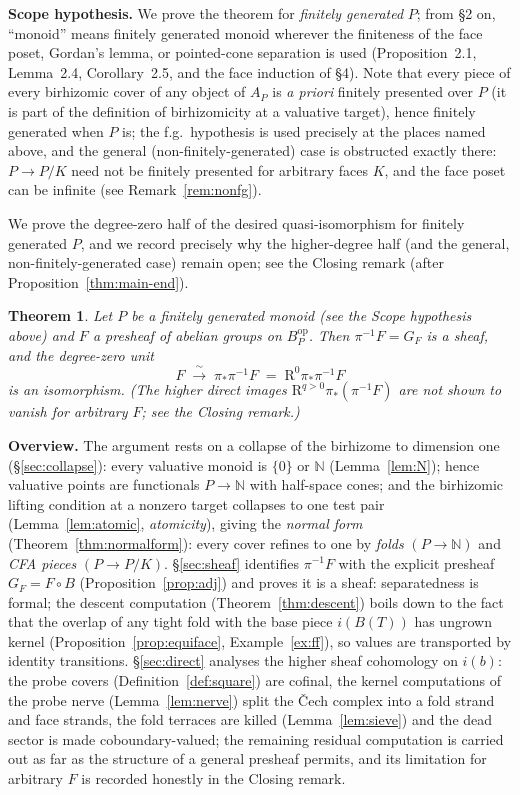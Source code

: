 \documentclass[11pt]{article}
\newtheorem{theorem}{Theorem}[section]
\theoremstyle{definition}
\newcommand{\op}{\mathrm{op}}
\begin{document}
\noindent\textbf{Scope hypothesis.} We prove the theorem for
\emph{finitely generated} $P$; from \S2 on, ``monoid'' means
finitely generated monoid wherever the finiteness of the face poset,
Gordan's lemma, or pointed-cone separation is used (Proposition~2.1,
Lemma~2.4, Corollary~2.5, and the face induction of \S4). Note that
every piece of every birhizomic cover of any object of $A_P$ is
\emph{a priori} finitely presented over $P$ (it is part of the
definition of birhizomicity at a valuative target), hence finitely
generated when $P$ is; the f.g.\ hypothesis is used precisely at the
places named above, and the general (non-finitely-generated) case is
obstructed exactly there: $P\to P/K$ need not be finitely presented
for arbitrary faces $K$, and the face poset can be infinite (see
Remark~\ref{rem:nonfg}).

We prove the degree-zero half of the desired quasi-isomorphism for
finitely generated $P$, and we record precisely why the higher-degree
half (and the general, non-finitely-generated case) remain open; see
the Closing remark (after Proposition~\ref{thm:main-end}).

\begin{theorem}\label{thm:main}
Let $P$ be a \emph{finitely generated} monoid \textup{(}see the Scope
hypothesis above\textup{)} and $F$ a presheaf of abelian groups on
$B_P^{\op}$. Then $\pi^{-1}F=G_F$ is a sheaf, and the degree-zero
unit
\[
F\;\xrightarrow{\ \sim\ }\;\pi_{*}\pi^{-1}F
\;=\;\mathrm R^{0}\pi_{*}\pi^{-1}F
\]
is an isomorphism. \textup{(}The higher direct images
$\mathrm R^{q>0}\pi_{*}(\pi^{-1}F)$ are \emph{not} shown to vanish
for arbitrary $F$; see the Closing remark.\textup{)}
\end{theorem}

\noindent\textbf{Overview.}
The argument rests on a collapse of the birhizome to dimension one
(\S\ref{sec:collapse}): every valuative monoid is $\{0\}$ or $\mathbb N$
(Lemma~\ref{lem:N}); hence valuative points are functionals
$P\to\mathbb N$ with half-space cones; and the birhizomic lifting
condition at a nonzero target collapses to one test pair
(Lemma~\ref{lem:atomic}, \emph{atomicity}), giving the \emph{normal
form} (Theorem~\ref{thm:normalform}): every cover refines to one by
\emph{folds} $(P\to\mathbb N)$ and \emph{CFA pieces} $(P\to P/K)$.
\S\ref{sec:sheaf} identifies $\pi^{-1}F$ with the explicit presheaf
$G_F=F\circ B$ (Proposition~\ref{prop:adj}) and proves it is a sheaf:
separatedness is formal; the descent computation
(Theorem~\ref{thm:descent}) boils down to the fact that the overlap of
any tight fold with the base piece $i(B(T))$ has ungrown kernel
(Proposition~\ref{prop:equiface}, Example~\ref{ex:ff}), so values are
transported by identity transitions. \S\ref{sec:direct} analyses the
higher sheaf cohomology on $i(b)$: the probe covers
(Definition~\ref{def:square}) are cofinal, the kernel computations of
the probe nerve (Lemma~\ref{lem:nerve}) split the \v{C}ech complex
into a fold strand and face strands, the fold terraces are killed
(Lemma~\ref{lem:sieve}) and the dead sector is made coboundary-valued;
the remaining residual computation is carried out as far as the
structure of a general presheaf permits, and its limitation for
arbitrary $F$ is recorded honestly in the Closing remark.
\end{document}
